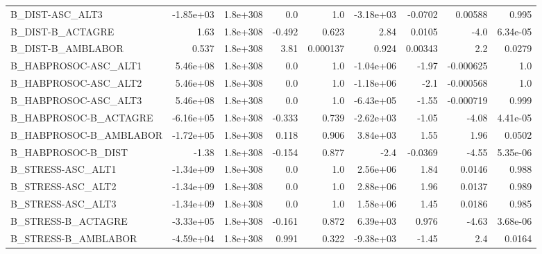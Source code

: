 \begin{tabular}{lrrrrrrrr}
B\_DIST-ASC\_ALT3                   &   -1.85e+03 &     1.8e+308 &     0.0 &      1.0 &  -3.18e+03 &     -0.0702 &      0.00588 &         0.995 \\
B\_DIST-B\_ACTAGRE                  &        1.63 &     1.8e+308 &  -0.492 &    0.623 &       2.84 &      0.0105 &         -4.0 &      6.34e-05 \\
B\_DIST-B\_AMBLABOR                 &       0.537 &     1.8e+308 &    3.81 & 0.000137 &      0.924 &     0.00343 &          2.2 &        0.0279 \\
B\_HABPROSOC-ASC\_ALT1              &    5.46e+08 &     1.8e+308 &     0.0 &      1.0 &  -1.04e+06 &       -1.97 &    -0.000625 &           1.0 \\
B\_HABPROSOC-ASC\_ALT2              &    5.46e+08 &     1.8e+308 &     0.0 &      1.0 &  -1.18e+06 &        -2.1 &    -0.000568 &           1.0 \\
B\_HABPROSOC-ASC\_ALT3              &    5.46e+08 &     1.8e+308 &     0.0 &      1.0 &  -6.43e+05 &       -1.55 &    -0.000719 &         0.999 \\
B\_HABPROSOC-B\_ACTAGRE             &   -6.16e+05 &     1.8e+308 &  -0.333 &    0.739 &  -2.62e+03 &       -1.05 &        -4.08 &      4.41e-05 \\
B\_HABPROSOC-B\_AMBLABOR            &   -1.72e+05 &     1.8e+308 &   0.118 &    0.906 &   3.84e+03 &        1.55 &         1.96 &        0.0502 \\
B\_HABPROSOC-B\_DIST                &       -1.38 &     1.8e+308 &  -0.154 &    0.877 &       -2.4 &     -0.0369 &        -4.55 &      5.35e-06 \\
B\_STRESS-ASC\_ALT1                 &   -1.34e+09 &     1.8e+308 &     0.0 &      1.0 &   2.56e+06 &        1.84 &       0.0146 &         0.988 \\
B\_STRESS-ASC\_ALT2                 &   -1.34e+09 &     1.8e+308 &     0.0 &      1.0 &   2.88e+06 &        1.96 &       0.0137 &         0.989 \\
B\_STRESS-ASC\_ALT3                 &   -1.34e+09 &     1.8e+308 &     0.0 &      1.0 &   1.58e+06 &        1.45 &       0.0186 &         0.985 \\
B\_STRESS-B\_ACTAGRE                &   -3.33e+05 &     1.8e+308 &  -0.161 &    0.872 &   6.39e+03 &       0.976 &        -4.63 &      3.68e-06 \\
B\_STRESS-B\_AMBLABOR               &   -4.59e+04 &     1.8e+308 &   0.991 &    0.322 &  -9.38e+03 &       -1.45 &          2.4 &        0.0164 \\

\end{tabular}

